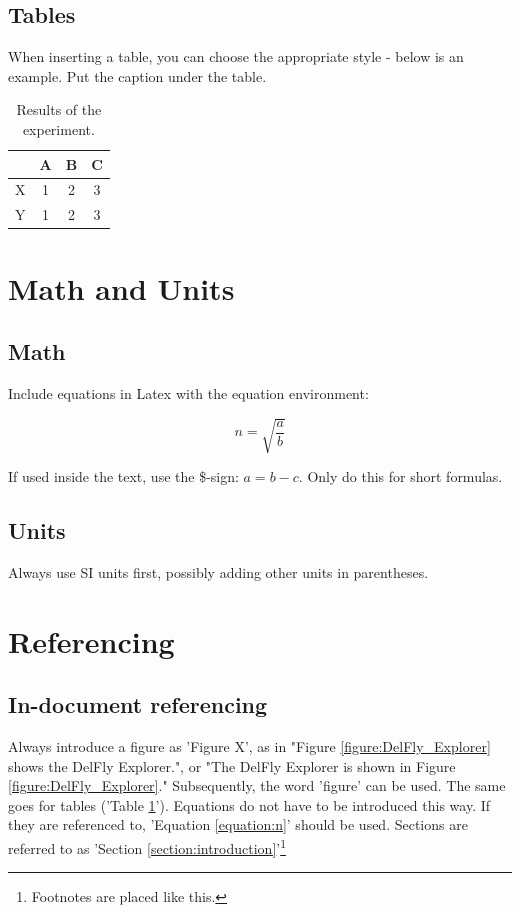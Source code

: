 \documentclass{article}
\begin{document}
\subsection{Tables}
When inserting a table, you can choose the appropriate style - below is an example. Put the caption under the table.

\begin{table}[hbt]
\begin{center}
\begin{tabular}{|l|c|c|c|}
\hline
& A & B& C\\
\hline
X & 1 & 2 & 3\\
Y & 1 & 2 & 3\\
\hline
\end{tabular}
\caption{Results of the experiment.}
\label{table:results}
\end{center}
\end{table}

\section{Math and Units}

\subsection{Math}
Include equations in Latex with the equation environment:

\begin{equation} \label{equation:n}
n = \sqrt{\frac{a}{b}}
\end{equation}

If used inside the text, use the \$-sign: $a =  b-c$. Only do this for short formulas.

\subsection{Units}
Always use SI units first, possibly adding other units in parentheses.

\section{Referencing}

\subsection{In-document referencing}
Always introduce a figure as 'Figure X', as in "Figure \ref{figure:DelFly_Explorer} shows the DelFly Explorer.", or "The DelFly Explorer is shown in Figure \ref{figure:DelFly_Explorer}." Subsequently, the word 'figure' can be used. The same goes for tables ('Table \ref{table:results}'). Equations do not have to be introduced this way. If they are referenced to, 'Equation \ref{equation:n}' should be used. Sections are referred to as 'Section \ref{section:introduction}'\footnote{Footnotes are placed like this.}
\end{document}
